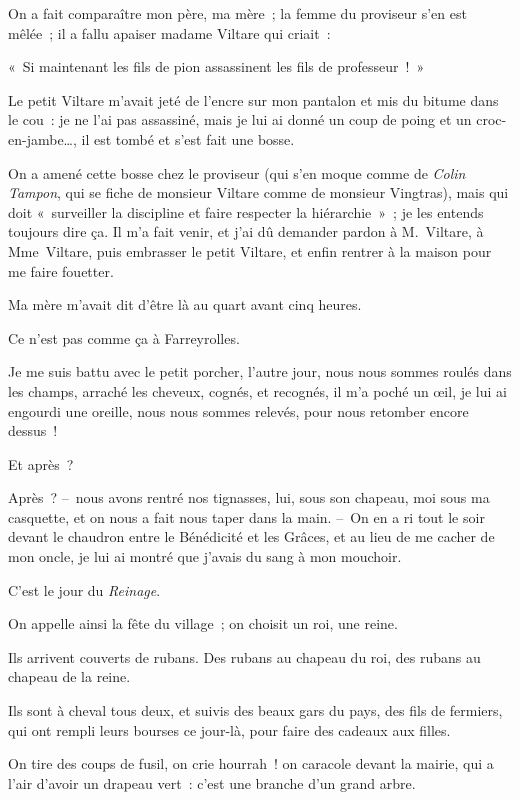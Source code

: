 \documentclass[french,twoside]{book} %
\begin{document}
On a fait comparaître mon père, ma mère ; la femme du proviseur s’en est mêlée ; il a fallu apaiser madame Viltare qui criait :\par
« Si maintenant les fils de pion assassinent les fils de professeur ! »\par
Le petit Viltare m’avait jeté de l’encre sur mon pantalon et mis du bitume dans le cou : je ne l’ai pas assassiné, mais je lui ai donné un coup de poing et un croc-en-jambe…, il est tombé et s’est fait une bosse.\par
On a amené cette bosse chez le proviseur (qui s’en moque comme de \emph{Colin Tampon}, qui se fiche de monsieur Viltare comme de monsieur Vingtras), mais qui doit « surveiller la discipline et faire respecter la hiérarchie » ; je les entends toujours dire ça. Il m’a fait venir, et j’ai dû demander pardon à M. Viltare, à Mme Viltare, puis embrasser le petit Viltare, et enfin rentrer à la maison pour me faire fouetter.\par
Ma mère m’avait dit d’être là au quart avant cinq heures.\par
\bigbreak
\noindent Ce n’est pas comme ça à Farreyrolles.\par
Je me suis battu avec le petit porcher, l’autre jour, nous nous sommes roulés dans les champs, arraché les cheveux, cognés, et recognés, il m’a poché un œil, je lui ai engourdi une oreille, nous nous sommes relevés, pour nous retomber encore dessus !\par
Et après ?\par
Après ? – nous avons rentré nos tignasses, lui, sous son chapeau, moi sous ma casquette, et on nous a fait nous taper dans la main. – On en a ri tout le soir devant le chaudron entre le Bénédicité et les Grâces, et au lieu de me cacher de mon oncle, je lui ai montré que j’avais du sang à mon mouchoir.\par
\bigbreak
\noindent C’est le jour du \emph{Reinage}.\par
On appelle ainsi la fête du village ; on choisit un roi, une reine.\par
Ils arrivent couverts de rubans. Des rubans au chapeau du roi, des rubans au chapeau de la reine.\par
Ils sont à cheval tous deux, et suivis des beaux gars du pays, des fils de fermiers, qui ont rempli leurs bourses ce jour-là, pour faire des cadeaux aux filles.\par
On tire des coups de fusil, on crie hourrah ! on caracole devant la mairie, qui a l’air d’avoir un drapeau vert : c’est une branche d’un grand arbre.\par
\end{document}
